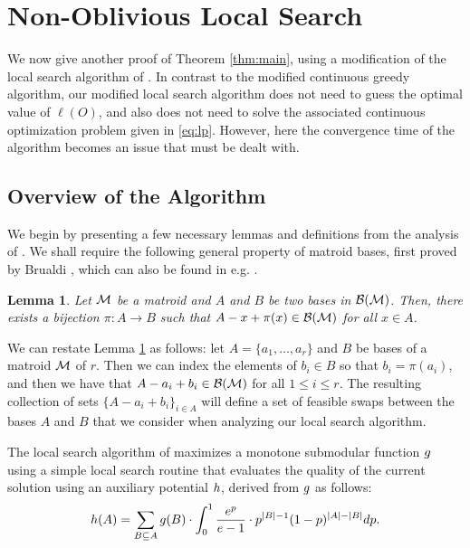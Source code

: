 \documentclass{article}
\newtheorem{lemma}[theorem]{Lemma}
\theoremstyle{definition}
\begin{document}
\section{Non-Oblivious Local Search}
\label{sec:non-oblivious-local}

We now give another proof of Theorem \ref{thm:main}, using a modification of the local search algorithm of \cite{Filmus2014}.  In contrast to the modified continuous greedy algorithm, our modified local search algorithm does not need to guess the optimal value of $\ell(O)$, and also does not need to solve the associated continuous optimization problem given in \eqref{eq:lp}.  However, here the convergence time of the algorithm becomes an issue that must be dealt with.

\subsection{Overview of the Algorithm}
\label{sec:overv-non-obliv}

We begin by presenting a few necessary lemmas and definitions from the analysis of \cite{Filmus2014}.  We shall require the following general property of matroid bases, first proved by Brualdi \cite{Brualdi1969}, which can also be found in e.g. \cite[Corollary 39.12a]{Schrijver2003}.
\begin{lemma}
\label{lem:brualdi}
Let $\mathcal{M}$ be a matroid and $A$ and $B$ be two bases in $\mathcal{B}(\mathcal{M})$.  Then, there exists a bijection $\pi : A \to B$ such that $A - x + \pi(x) \in \mathcal{B}(\mathcal{M})$ for all $x \in A$.
\end{lemma}
We can restate Lemma \ref{lem:brualdi} as follows: let $A = \{a_{1},\ldots,a_{r}\}$ and $B$ be bases of a matroid $\mathcal{M}$ of $r$.  Then we can index the elements of $b_{i} \in B$ so that $b_{i} = \pi(a_{i})$, and then we have that $A - a_{i} + b_{i} \in \mathcal{B}(\mathcal{M})$ for all $1 \le i \le r$.  The resulting collection of sets $\{A - a_{i} +b_{i}\}_{i \in A}$ will define a set of feasible swaps between the bases $A$ and $B$ that we consider when analyzing our local search algorithm.

The local search algorithm of \cite{Filmus2014} maximizes a monotone submodular function $g$ using a simple local search routine that evaluates the quality of the current solution using an auxiliary potential $h$, derived from $g$ as follows:
\begin{equation*}
h(A) = \sum_{B \subseteq A}g(B) \cdot \int_{0}^{1}\frac{e^{p}}{e - 1}\cdot p^{|B| - 1}(1 - p)^{|A| - |B|} dp.
\end{equation*}
\end{document}
